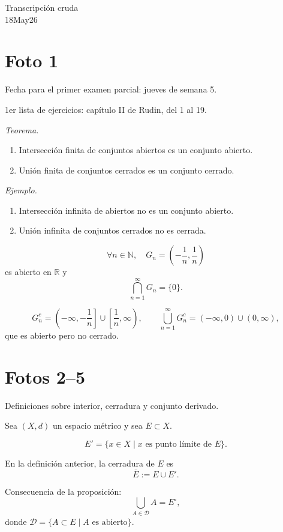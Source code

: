 \documentclass[12pt]{article}
\begin{document}
\begin{center}
{\Large Transcripción cruda}\\[2mm]
{\large 18May26}
\end{center}

\section*{Foto 1}

Fecha para el primer examen parcial: jueves de semana 5.

1er lista de ejercicios: capítulo II de Rudin, del 1 al 19.

\textit{Teorema.}
\begin{enumerate}[label=\alph*)]
    \item Intersección finita de conjuntos abiertos es un conjunto abierto.
    \item Unión finita de conjuntos cerrados es un conjunto cerrado.
\end{enumerate}

\textit{Ejemplo.}
\begin{enumerate}[label=\alph*)]
    \item Intersección infinita de abiertos no es un conjunto abierto.
    \item Unión infinita de conjuntos cerrados no es cerrada.
\end{enumerate}

\[
\forall n\in\mathbb N,\quad G_n=\left(-\frac1n,\frac1n\right)
\]
es abierto en $\mathbb R$ y
\[
\bigcap_{n=1}^{\infty}G_n=\{0\}.
\]

\[
G_n^c=\left(-\infty,-\frac1n\right]\cup\left[\frac1n,\infty\right),
\qquad
\bigcup_{n=1}^{\infty}G_n^c=(-\infty,0)\cup(0,\infty),
\]
que es abierto pero no cerrado.

\section*{Fotos 2--5}

Definiciones sobre interior, cerradura y conjunto derivado.

Sea $(X,d)$ un espacio métrico y sea $E\subset X$.

\[
E'=\{x\in X\mid x \text{ es punto límite de }E\}.
\]

En la definición anterior, la cerradura de $E$ es
\[
\overline E:=E\cup E'.
\]

Consecuencia de la proposición:
\[
\bigcup_{A\in\mathcal D}A=E^\circ,
\]
donde $\mathcal D=\{A\subset E\mid A \text{ es abierto}\}$.
\end{document}
